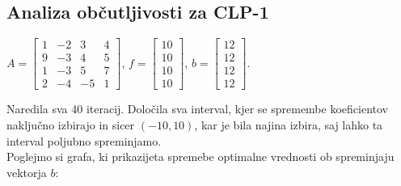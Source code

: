 \documentclass[a4paper,12pt]{article}
\begin{document}
\subsection{Analiza občutljivosti za CLP-1}

\begin{center}
$ A = \begin{bmatrix}
  1 & -2 & 3 & 4 \\
  9 & -3 & 4 & 5 \\
  1 & -3 & 5 & 7 \\
  2 & -4 & -5 & 1  
\end{bmatrix} $, $f=\begin{bmatrix} 10 \\10 \\10\\10 \end{bmatrix}$, $b=\begin{bmatrix} 12 \\12 \\12\\12 \end{bmatrix}.$
\\[0.5cm]
\end{center}

Naredila sva 40 iteracij. Določila sva interval, kjer se spremembe koeficientov naključno izbirajo in sicer $(-10,10)$, kar je bila najina izbira, saj lahko ta interval poljubno spreminjamo. 
\\[0.5cm]
Poglejmo si grafa, ki prikazijeta spremebe optimalne vrednosti ob spreminjaju
vektorja $b$:
\end{document}
